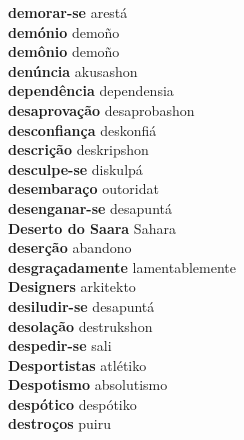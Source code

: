 \textbf{ demorar-se  } arestá \\
\textbf{ demónio  } demoño \\
\textbf{ demônio  } demoño \\
\textbf{ denúncia  } akusashon \\
\textbf{ dependência  } dependensia \\
\textbf{ desaprovação  } desaprobashon \\
\textbf{ desconfiança  } deskonfiá \\
\textbf{ descrição  } deskripshon \\
\textbf{ desculpe-se  } diskulpá \\
\textbf{ desembaraço  } outoridat \\
\textbf{ desenganar-se  } desapuntá \\
\textbf{ Deserto do Saara  } Sahara \\
\textbf{ deserção  } abandono \\
\textbf{ desgraçadamente  } lamentablemente \\
\textbf{ Designers  } arkitekto \\
\textbf{ desiludir-se  } desapuntá \\
\textbf{ desolação  } destrukshon \\
\textbf{ despedir-se  } sali \\
\textbf{ Desportistas  } atlétiko \\
\textbf{ Despotismo  } absolutismo \\
\textbf{ despótico  } despótiko \\
\textbf{ destroços  } puiru \\
